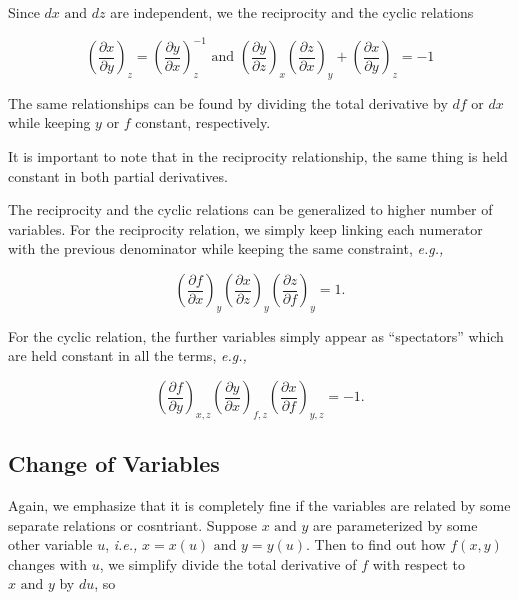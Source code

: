 \documentclass[english,a4paper,12pt]{report}
\begin{document}
Since \(dx \text { and }  dz\) are independent, we the reciprocity and the cyclic relations

\begin{equation}
    \left( \frac{\partial x}{\partial y}  \right)_{z} = \left( \frac{\partial y}{\partial x}  \right)_{z}^{-1} \text { and } \left( \frac{\partial y}{\partial z}  \right)_{x} \left( \frac{\partial z}{\partial x}  \right)_{y} + \left( \frac{\partial x}{\partial y}  \right)_{z} = -1 
\end{equation}

The same relationships can be found by dividing the total derivative by \(df \text { or } dx\) while keeping \(y \text { or } f\) constant, respectively.

It is important to note that in the reciprocity relationship, the same thing is held constant in both partial derivatives. 

The reciprocity and the cyclic relations can be generalized to higher number of variables. For the reciprocity relation, we simply keep linking each numerator with the previous denominator while keeping the same constraint, \textit{e.g.,} 

\begin{equation}
	\left( \frac{\partial f}{\partial x}  \right)_{y} \left( \frac{\partial x}{\partial z}  \right)_{y} \left( \frac{\partial z}{\partial f}  \right)_{y} = 1. 
\end{equation}

For the cyclic relation, the further variables simply appear as ``spectators'' which are held constant in all the terms, \textit{e.g.,} 

\begin{equation}
	\left( \frac{\partial f}{\partial y}  \right)_{x,z} \left( \frac{\partial y}{\partial x}  \right)_{f,z}\left( \frac{\partial x}{\partial f}  \right)_{y,z} = -1.  
\end{equation}





\subsection{Change of Variables}

Again, we emphasize that it is completely fine if the variables are related by some separate relations or cosntriant. Suppose \(x \text { and } y\) are parameterized by some other variable \(u\), \textit{i.e.,} \(x = x(u) \text { and } y = y(u)\). Then to find out how \(f(x,y)\) changes with \(u\), we simplify divide the total derivative of \(f\) with respect to \(x \text { and } y\) by \(du\), so
\end{document}
